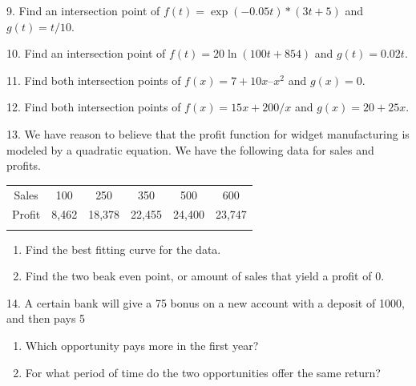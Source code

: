 \documentclass[10pt,]{book}
\theoremstyle{plain}
\theoremstyle{definition}
\theoremstyle{definition}
\newcommand{\hrulethin}  {\noalign{\hrule height 0.04em}}
\newcommand{\hrulemedium}{\noalign{\hrule height 0.07em}}
\newcommand{\hrulethick} {\noalign{\hrule height 0.11em}}
\begin{document}
\begin{exerciselist}
\item[9.]\hypertarget{exercise-83}{} Find an intersection point of \(f(t) = \exp(-0.05 t)*(3 t + 5)\) and \(g(t) = t/10\).
%
\par\smallskip
\item[10.]\hypertarget{exercise-84}{} Find an intersection point of \(f(t) = 20 \ln(100 t + 854)\) and \(g(t) = 0.02 t\).
%
\par\smallskip
\item[11.]\hypertarget{exercise-85}{} Find both intersection points of \(f(x) = 7 + 10 x – x^2\) and \(g(x) = 0\).
%
\par\smallskip
\item[12.]\hypertarget{exercise-86}{} Find both intersection points of \(f(x) = 15 x + 200/x\) and \(g(x) = 20 + 25 x\).

%
\par\smallskip
\item[13.]\hypertarget{exercise-87}{} We have reason to believe that the profit function for widget manufacturing is modeled by a quadratic equation.  We have the following data for sales and profits.%
\leavevmode%
\begin{table}
\centering
\begin{tabular}{cccccc}\hrulethick
Sales&100&250&350&500&600\tabularnewline\hrulethin
Profit&\textdollar{}8,462&\textdollar{}18,378&\textdollar{}22,455&\textdollar{}24,400&\textdollar{}23,747\tabularnewline\hrulemedium
\end{tabular}
\end{table}
\leavevmode%
\begin{enumerate}[label=(\alph*)]
\item\hypertarget{li-106}{} Find the best fitting curve for the data.%
\item\hypertarget{li-107}{} Find the two beak even point, or amount of sales that yield a profit of \textdollar{}0.
%
\end{enumerate}
\par\smallskip
\item[14.]\hypertarget{exercise-88}{} A certain bank will give a \textdollar{}75 bonus on a new account with a deposit of \textdollar{}1000, and then pays 5%
\leavevmode%
\begin{enumerate}[label=(\alph*)]
\item\hypertarget{li-108}{} Which opportunity pays more in the first year?%
\item\hypertarget{li-109}{} For what period of time do the two opportunities offer the same return?%

\end{enumerate}
\end{exerciselist}
\end{document}
